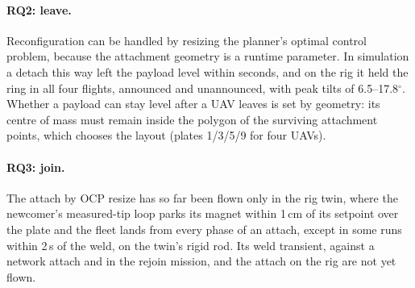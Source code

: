 \paragraph{RQ2: leave.} Reconfiguration can be handled by resizing the planner's optimal control problem,
because the attachment geometry is a runtime parameter. In simulation a detach this way left the payload level
within seconds, and on the rig it held the ring in all four flights, announced and unannounced, with peak tilts
of 6.5--17.8$^\circ$.
Whether a payload can stay level after a UAV leaves is set by geometry: its centre of mass
must remain inside the polygon of the surviving attachment points, which chooses the layout
(plates 1/3/5/9 for four UAVs).

\paragraph{RQ3: join.} The attach by OCP resize has so far been flown only in the rig twin, where the
newcomer's measured-tip loop parks its magnet within 1\,cm of its setpoint over the plate and the fleet lands from every phase of
an attach, except in some runs within 2\,s of the weld, on the twin's rigid rod. Its weld transient, against a network attach and
in the rejoin mission, and the attach on the rig are not yet flown.


